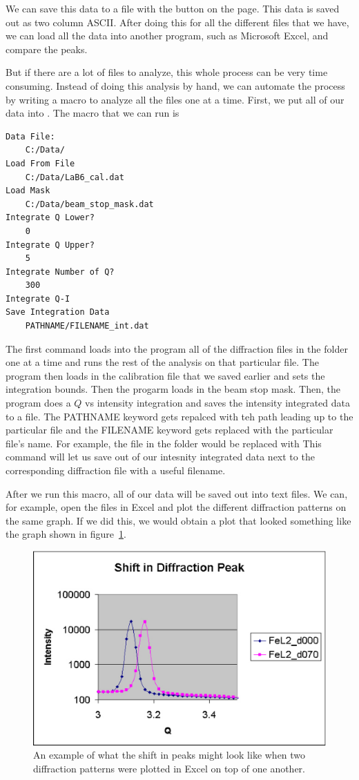 We can save this data to a file with the 
button on the  page. This data is
saved out as two column ASCII.
After doing this for all the different files that
we have, we can load all the data into another program,
such as Microsoft Excel, and compare the peaks.

But if there are a lot of files to analyze, this whole
process can be very time consuming. Instead of doing 
this analysis by hand, we can automate the process by
writing a macro to analyze all the files one at a 
time. First, we put all of our data into .
The macro that we can run is
\begin{lstlisting}[caption={'A macro to automate the 
    analysis'}]
Data File:
	C:/Data/
Load From File
    C:/Data/LaB6_cal.dat
Load Mask
    C:/Data/beam_stop_mask.dat
Integrate Q Lower?
	0
Integrate Q Upper?
	5
Integrate Number of Q?
	300
Integrate Q-I
Save Integration Data
    PATHNAME/FILENAME_int.dat
\end{lstlisting}
The first command loads into the program all of the
diffraction files in the folder 
one at a time and runs the rest of the analysis on
that particular file. The program then loads in
the calibration file that we saved earlier and sets the
integration bounds. Then the progarm loads in the
beam stop mask. Then, the program does a 
$Q$ vs intensity integration and saves the intensity
integrated data to a file. The PATHNAME keyword gets
repalced with teh path leading up to the particular 
file and the FILENAME keyword gets replaced with 
the particular file's name. For example, the file
 in
the folder  would
be replaced with
This command will let us save out of our intesnity
integrated data next to the corresponding diffraction
file with a useful filename.

After we run this macro, all of our data will 
be saved out into text files. We can, for
example, open the files in Excel and plot
the different diffraction patterns on the same
graph. If we did this, we would obtain a plot
that looked something like the graph shown
in figure~\ref{excel_peak_shift}.

\begin{figure}
    \centering
    \includegraphics[scale=.5]{figures/excel_peak_shift.eps}
    \caption{An example of what the shift in peaks might
    look like when two diffraction patterns were plotted
    in Excel on top of one another.}
    \label{excel_peak_shift}
\end{figure}


